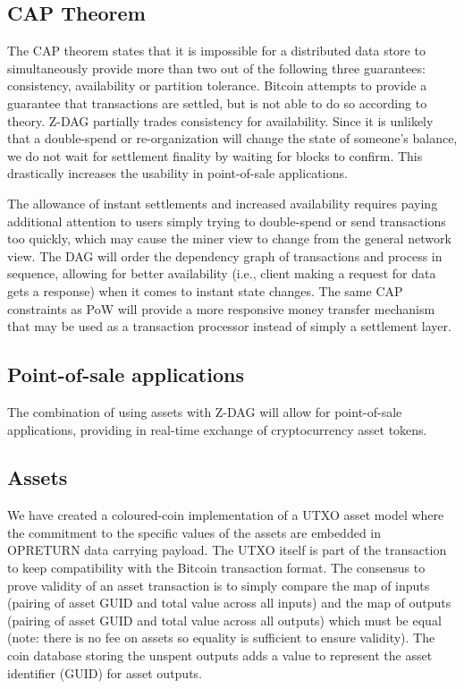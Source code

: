 \documentclass[peerreview]{ieeesyscoin}
\begin{document}
\subsection{CAP Theorem}
The CAP theorem \cite{Bre12} states that it is impossible for a distributed data store to simultaneously provide more than two out of the following three guarantees: consistency, availability or partition tolerance. Bitcoin attempts to provide a guarantee that transactions are settled, but is not able to do so according to theory. Z-DAG partially trades consistency for availability. Since it is unlikely that a double-spend or re-organization will change the state of someone’s balance, we do not wait for settlement finality by waiting for blocks to confirm. This drastically increases the usability in point-of-sale applications.

The allowance of instant settlements and increased availability requires paying additional attention to users simply trying to double-spend or send transactions too quickly, which may cause the miner view to change from the general network view. The DAG will order the dependency graph of transactions and process in sequence, allowing for better availability (i.e., client making a request for data gets a response) when it comes to instant state changes. The same CAP constraints as PoW will provide a more responsive money transfer mechanism that may be used as a transaction processor instead of simply a settlement layer.

\subsection{Point-of-sale applications}
The combination of using assets with Z-DAG will allow for point-of-sale applications, providing in real-time exchange of cryptocurrency asset tokens.

\subsection{Assets}
We have created a coloured-coin implementation of a UTXO asset model where the commitment to the specific values of the assets are embedded in OPRETURN data carrying payload. The UTXO itself is part of the transaction to keep compatibility with the Bitcoin transaction format. The consensus to prove validity of an asset transaction is to simply compare the map of inputs (pairing of asset GUID and total value across all inputs) and the map of outputs (pairing of asset GUID and total value across all outputs) which must be equal (note: there is no fee on assets so equality is sufficient to ensure validity). The coin database storing the unspent outputs adds a value to represent the asset identifier (GUID) for asset outputs.
\end{document}
